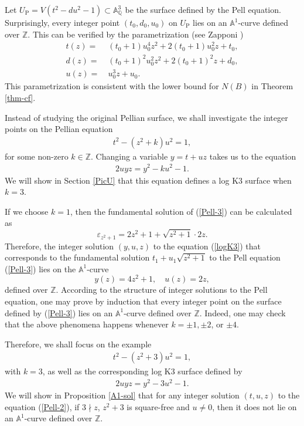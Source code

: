 \documentclass[reqno, 11pt, twoside]{amsart}
\numberwithin{equation}{section}
\theoremstyle{definition}
\newcommand{\eps}{\varepsilon}
\newcommand{\AAA}{\mathbb{A}}
\newcommand{\QQ}{\mathbb{Q}}
\newcommand{\ZZ}{\mathbb{Z}}
\begin{document}
Let $ U_\mathrm{P} = V(t^2 - du^2 - 1) \subset \AAA_\QQ^3 $ be the surface defined by the Pell equation. Surprisingly, every integer point $(t_0,d_0,u_0)$ on $U_\mathrm{P}$ lies on an $\AAA^1$-curve defined over $\ZZ$. This can be verified by the parametrization (see Zapponi \cite[Proposition 3]{Zap})
\begin{align*}
	t(z) = & \ (t_0 + 1)u_0^4z^2 + 2(t_0 + 1)u_0^2z + t_0, \\
	d(z)  = & \ (t_0 + 1)^2u_0^2z^2 + 2(t_0 + 1)^2z + d_0, \\
	u(z)  = & \ u_0^3 z + u_0.
\end{align*}
This parametrization is consistent with the lower bound for $N(B)$ in Theorem \ref{thm-cf}.

Instead of studying the original Pellian surface, we shall investigate the integer points on the Pellian equation
\begin{eqnarray}\label{Pell-3}
	t^2 - (z^2 + k) u^2 = 1,
\end{eqnarray}
for some non-zero $k \in \ZZ$.
Changing a variable $y = t + uz$ takes us to the equation 
\begin{eqnarray}\label{logK3}
	2uyz = y^2 - ku^2 - 1.
\end{eqnarray} 
We will show in Section \ref{PicU} that this equation defines a log K3 surface when $k = 3$.

If we choose $k = 1$, then the fundamental solution of (\ref{Pell-3}) can be calculated as
$$\eps_{z^2 + 1} = 2z^2 + 1 + \sqrt{z^2 + 1} \cdot 2z.$$ Therefore, the integer solution $(y, u, z)$ to the equation (\ref{logK3}) that corresponds to the fundamental solution $t_1 + u_1 \sqrt{z^2 + 1}$ to the Pell equation (\ref{Pell-3}) lies on the $\AAA^1$-curve
$$y(z) = 4z^2 + 1, \quad u(z) = 2z,$$
defined over $\ZZ$. According to the structure of integer solutions to the Pell equation, one may prove by induction that every integer point on the surface defined by (\ref{Pell-3}) lies on an $\AAA^1$-curve defined over $\ZZ$.
Indeed, one may check that the above phenomena happens whenever $k = \pm 1, \pm 2$, or $\pm 4$.

Therefore, we shall focus on the example
\begin{eqnarray}\label{Pell-2}
	t^2 - (z^2 + 3) u^2 = 1,
\end{eqnarray}
with $k = 3$, as well as the corresponding log K3 surface defined by 
\begin{eqnarray}\label{logK3-2}
	2uyz = y^2 - 3u^2 - 1.
\end{eqnarray}
We will show in Proposition \ref{A1-sol} that for any integer solution $(t,u,z)$ to the equation (\ref{Pell-2}), if $3 \nmid z$, $z^2 + 3$ is square-free and $u \neq 0$, then it does not lie on an $\mathbb{A}^1$-curve defined over $\mathbb{Z}$.
\end{document}

